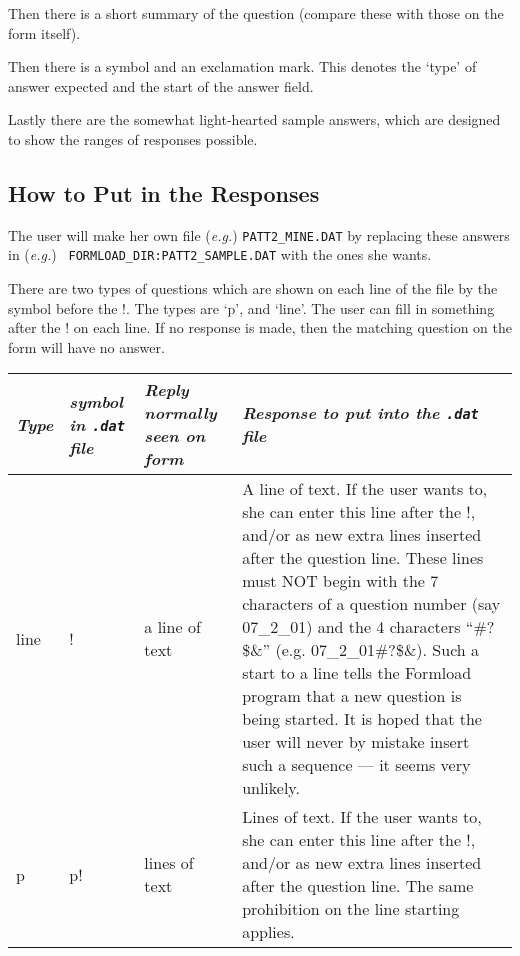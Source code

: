 Then there is a short summary of the question (compare these with those on
the form itself). 

Then there is a symbol and an exclamation mark. This denotes the `type' of
answer expected and the start of the answer field. 

Lastly there are the somewhat light-hearted sample answers, which are
designed to show the ranges of responses possible. 

\subsection{How to Put in the Responses}

The user will make her own file ({\it e.g.}) {\tt PATT2\_MINE.DAT} by
replacing these answers in \newline ({\it e.g.}) {\tt
FORMLOAD\_DIR:PATT2\_SAMPLE.DAT} with the ones she wants. 

There are two types of questions which are shown on each line of the file
by the symbol before the !. The types are `p', and `line'. The user can
fill in something after the ! on each line. If no response is made, then
the matching question on the form will have no answer. 

{\small
\begin{tabular}{|l|p{0.6in}|p{1.2in}|p{3.5in}|} \hline
{\it Type} & {\it symbol in {\tt .dat} file}   & {\it Reply normally seen on 
form} & {\it Response to put into the {\tt .dat} file} \\ \hline
line  &     !  &   a line of text  &  A line of text. If the user wants to,
                                      she can enter this line after the !, 
                                      and/or as new extra lines inserted
                                      after the question line.
                                      These lines must NOT begin with the
                                      7 characters of a question number
                                      (say 07\_2\_01) and the 4 characters
                                      ``\#?\$\&'' (e.g. 07\_2\_01\#?\$\&). Such a
                                      start to a line tells the Formload
                                      program that a new question is
                                      being started. It is hoped that the user will
                                      never by mistake insert such a 
                                      sequence --- it seems very unlikely. \\  \hline
p     &    p!  & lines of text    &   Lines of text. If the user wants to,
                                      she can enter this line after the !, 
                                      and/or as new extra lines inserted
                                      after the question line. 
                                      The same prohibition on the line
                                      starting applies. \\  \hline
\end{tabular}}


